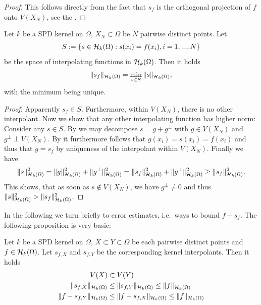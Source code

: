 \begin{proof}
This follows directly from the fact that $s_f$ is the orthogonal projection of $f$ onto $V(X_N)$, see the .
\end{proof}

\begin{prop}
\label{prop:minimal_norm_interpol}
Let $k$ be a SPD kernel on $\Omega$, $X_N \subset \Omega$ be $N$ pairwise distinct points.
Let
\begin{align*}
	S := \{ s \in \mathcal H_k (\Omega): s(x_i) = f(x_i), i=1, ..., N\}
\end{align*}
be the space of interpolating functions in $\mathcal H_k (\Omega)$. 
Then it holds
\begin{align*}
\Vert s_f \Vert_{\mathcal H_k (\Omega)} = \min_{s \in S} \Vert s \Vert_{\mathcal H_k (\Omega)},
\end{align*}
with the minimum being unique.
\end{prop}

\begin{proof}
Apparently $s_f \in S$.
Furthermore, within $V(X_N)$, 
there is no other interpolant.
Now we show that any other interpolating function has higher norm:
Consider any $s \in S$.
By  we may decompose $s = g + g^\perp$ with $g \in V(X_N)$ and $g^\perp \perp V(X_N)$.
By  it furthermore follows that $g(x_i) = s(x_i) = f(x_i)$ and thus that $g = s_f$ by uniqueness of the interpolant within $V(X_N)$.
Finally we have
\begin{align*}
\Vert s \Vert_{\mathcal H_k (\Omega)}^2 = \Vert g \Vert_{\mathcal H_k (\Omega)}^2 + \Vert g^\perp \Vert_{\mathcal H_k (\Omega)}^2 = \Vert s_f \Vert_{\mathcal H_k (\Omega)}^2 + \Vert g^\perp \Vert_{\mathcal H_k (\Omega)}^2 \geq \Vert s_f \Vert_{\mathcal H_k (\Omega)}^2.
\end{align*}
This shows, that as soon as $s \notin V(X_N)$, we have $g^\perp \neq 0$ and thus $\Vert s \Vert_{\mathcal H_k (\Omega)}^2 > \Vert s_f \Vert_{\mathcal H_k (\Omega)}^2$.
\end{proof}


In the following we turn briefly to error estimates, i.e.\
ways to bound $f - s_f$.
The following proposition is very basic:

\begin{prop}
Let $k$ be a SPD kernel on $\Omega$, $X \subset Y \subset \Omega$ be each pairwise distinct points and $f \in \mathcal H_k (\Omega)$.
Let $s_{f, X}$ and $s_{f, Y}$ be the corresponding kernel interpolants.
Then it holds
\begin{align*}
V(X) &\subset V(Y) \\
\Vert s_{f, X} \Vert_{\mathcal H_k (\Omega)} &\leq \Vert s_{f, Y} \Vert_{\mathcal H_k (\Omega)} \leq \Vert f \Vert_{\mathcal H_k (\Omega)} \\
\Vert f - s_{f, Y} \Vert_{\mathcal H_k (\Omega)} &\leq \Vert f - s_{f, X} \Vert_{\mathcal H_k (\Omega)} \leq \Vert f \Vert_{\mathcal H_k (\Omega)}
\end{align*}
\end{prop}

